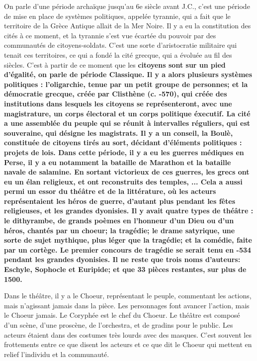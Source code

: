 \documentclass[11pt]{article}
\begin{document}
On parle d'une période archaïque jusqu'au 6e siècle avant J.C., c'est une période de mise en place de systèmes politiques, appelée tyrannie, qui a fait que le territoire de la Grèce Antique allait de la Mer Noire. Il y a eu la constitution des cités à ce moment, et la tyrannie s'est vue écartée du pouvoir par des communautés de citoyens-soldats. C'est une sorte d'aristocratie militaire qui tenait ces territoires, ce qui a fondé la cité grecque, qui a évoluée au fil des siècles. C'est à partir de ce moment que les \bf{citoyens} sont sur un pied d'égalité, on parle de période Classique. Il y a alors plusieurs systèmes politiques : l'oligarchie, tenue par un petit groupe de personnes; et la démocratie grecque, créée par Clisthène (c. -570), qui créée des institutions dans lesquels les citoyens se représenteront, avec une magistrature, un corps électoral et un corps politique éxecutif. La cité a une assemblée du peuple qui se réunit à intervalles réguliers, qui est souveraine, qui désigne les magistrats. Il y a un conseil, la Boulè, constituée de citoyens tirés au sort, décidant d'éléments politiques : projets de lois.
Dans cette période, il y a eu les guerres médiques en Perse, il y a eu notamment la bataille de Marathon et la bataille navale de salamine. En sortant victorieux de ces guerres, les grecs ont eu un élan religieux, et ont reconstruits des temples, ... Cela a aussi permi un essor du théâtre et de la littérature, où les acteurs représentaient les héros de guerre, d'autant plus pendant les fêtes religieuses, et les grandes dyonisies. Il y avait quatre types de théâtre : le dithyrambe, de grands poèmes en l'honneur d'un Dieu ou d'un héros, chantés par un choeur; la tragédie; le drame satyrique, une sorte de sujet mythique, plus léger que la tragédie; et la comédie, faite par un cortège. Le premier concours de tragédie se serait tenu en -534 pendant les grandes dyonisies. Il ne reste que trois noms d'auteurs: Eschyle, Sophocle et Euripide; et que 33 pièces restantes, sur plus de 1500.

Dans le théâtre, il y a le Choeur, représentant le peuple, commentant les actions, mais n'agissant jamais dans la pièce. Les personnages font avancer l'action, mais le Choeur jamais. Le Coryphée est le chef du Choeur. Le théâtre est composé d'un scène, d'une proscène, de l'orchestra, et de gradins pour le public. Les acteurs étaient dans des costumes très lourds avec des masques. C'est souvent les frottements entre ce que disent les acteurs et ce que dit le Choeur qui mettent en relief l'individu et la communauté.
\end{document}
